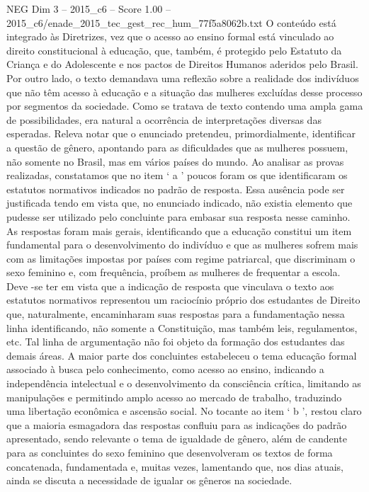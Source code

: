 \begin{textsample}{NEG Dim 3 – 2015\_c6 – Score 1.00 – 2015\_c6/enade\_2015\_tec\_gest\_rec\_hum\_77f5a8062b.txt}
O conteúdo está integrado às Diretrizes, vez que o acesso ao ensino formal está vinculado ao direito constitucional à educação, que, também, é protegido pelo Estatuto da Criança e do Adolescente e nos pactos de Direitos Humanos aderidos pelo Brasil.
Por outro lado, o texto demandava uma reflexão sobre a realidade dos indivíduos que não têm acesso à educação e a situação das mulheres excluídas desse processo por segmentos da sociedade.
Como se tratava de texto contendo uma ampla gama de possibilidades, era natural a ocorrência de interpretações diversas das esperadas.
Releva notar que o enunciado pretendeu, primordialmente, identificar a questão de gênero, apontando para as dificuldades que as mulheres possuem, não somente no Brasil, mas em vários países do mundo.
Ao analisar as provas realizadas, constatamos que no item ‘ a ’ poucos foram os que identificaram os estatutos normativos indicados no padrão de resposta.
Essa ausência pode ser justificada tendo em vista que, no enunciado indicado, não existia elemento que pudesse ser utilizado pelo concluinte para embasar sua resposta nesse caminho.
As respostas foram mais gerais, identificando que a educação constitui um item fundamental para o desenvolvimento do indivíduo e que as mulheres sofrem mais com as limitações impostas por países com regime patriarcal, que discriminam o sexo feminino e, com frequência, proíbem as mulheres de frequentar a escola.
Deve -se ter em vista que a indicação de resposta que vinculava o texto aos estatutos normativos representou um raciocínio próprio dos estudantes de Direito que, naturalmente, encaminharam suas respostas para a fundamentação nessa linha identificando, não somente a Constituição, mas também leis, regulamentos, etc.
Tal linha de argumentação não foi objeto da formação dos estudantes das demais áreas.
A maior parte dos concluintes estabeleceu o tema educação formal associado à busca pelo conhecimento, como acesso ao ensino, indicando a independência intelectual e o desenvolvimento da consciência crítica, limitando as manipulações e permitindo amplo acesso ao mercado de trabalho, traduzindo uma libertação econômica e ascensão social.
No tocante ao item ‘ b ’, restou claro que a maioria esmagadora das respostas confluiu para as indicações do padrão apresentado, sendo relevante o tema de igualdade de gênero, além de candente para as concluintes do sexo feminino que desenvolveram os textos de forma concatenada, fundamentada e, muitas vezes, lamentando que, nos dias atuais, ainda se discuta a necessidade de igualar os gêneros na sociedade.

\end{textsample}
